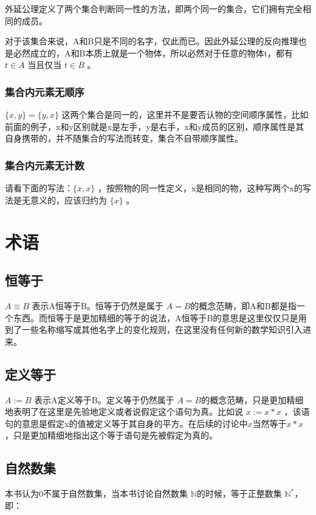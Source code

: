 \documentclass[12pt,oneside]{book}
\begin{document}
外延公理定义了两个集合判断同一性的方法，即两个同一的集合，它们拥有完全相同的成员。

对于该集合来说，A和B只是不同的名字，仅此而已。因此外延公理的反向推理也是必然成立的，A和B本质上就是一个物体，所以必然对于任意的物体t，都有 $t \in A$ 当且仅当 $t \in B$ 。


\subsection{集合内元素无顺序}
$\{x, y\} =\{y, x\}$ 这两个集合是同一的，这里并不是要否认物的空间顺序属性，比如前面的例子，x和y区别就是x是左手，y是右手，x和y成员的区别，顺序属性是其自身携带的，并不随集合的写法而转变，集合不自带顺序属性。

\subsection{集合内元素无计数}
请看下面的写法：$\{x, x\}$ ，按照物的同一性定义，x是相同的物，这种写两个x的写法是无意义的，应该归约为 $\{x\}$ 。




\chapter{术语}
\section{恒等于}
$A \equiv B$ 表示A恒等于B。恒等于仍然是属于 $A=B$的概念范畴，即A和B都是指一个东西。而恒等于是更加精细的等于的说法，A恒等于B的意思是这里仅仅只是用到了一些名称缩写或其他名字上的变化规则，在这里没有任何新的数学知识引入进来。

\section{定义等于}
$A := B$ 表示A定义等于B。定义等于仍然属于 $A=B$的概念范畴，只是更加精细地表明了在这里是先验地定义或者说假定这个语句为真。比如说 $x := x*x$ ，该语句的意思是假定x的值被定义等于其自身的平方。在后续的讨论中$x$当然等于$x*x$，只是更加精细地指出这个等于语句是先被假定为真的。





\section{自然数集}
本书认为0不属于自然数集，当本书讨论自然数集 $ \mathbb{N} $的时候，等于正整数集 $\mathbb{N}^{*}$，即：
\end{document}
